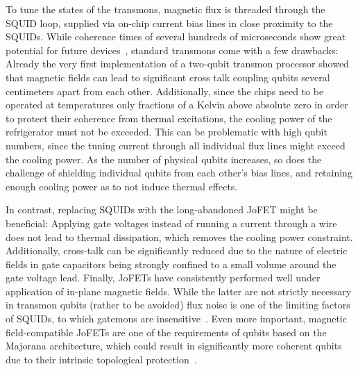 To tune the states of the transmons, magnetic flux is threaded through the SQUID loop, supplied via on-chip current bias lines in close proximity to the SQUIDs.
%
While coherence times of several hundreds of microseconds show great potential for future devices~\cite{placeNewMaterialPlatform2020}, standard transmons come with a few drawbacks:
%
Already the very first implementation of a two-qubit transmon processor showed that magnetic fields can lead to significant cross talk coupling qubits several centimeters apart from each other\cite{dicarloDemonstrationTwoqubitAlgorithms2009}.
%
Additionally, since the chips need to be operated at temperatures only fractions of a Kelvin above absolute zero in order to protect their coherence from thermal excitations, the cooling power of the refrigerator must not be exceeded.
%
This can be problematic with high qubit numbers, since the tuning current through all individual flux lines might exceed the cooling power.
%
As the number of physical qubits increases, so does the challenge of shielding individual qubits from each other's bias lines, and retaining enough cooling power as to not induce thermal effects.

In contrast, replacing SQUIDs with the long-abandoned JoFET might be beneficial:
%
Applying gate voltages instead of running a current through a wire does not lead to thermal dissipation, which removes the cooling power constraint.
%
Additionally, cross-talk can be significantly reduced due to the nature of electric fields in gate capacitors being strongly confined to a small volume around the gate voltage lead.
%
Finally, JoFETs have consistently performed well under application of in-plane magnetic fields.
%
While the latter are not strictly necessary in transmon qubits (rather to be avoided) flux noise is one of the limiting factors of SQUIDs, to which gatemons are insensitive~\cite{casparisSuperconductingGatemonQubit2018}.
%
Even more important, magnetic field-compatible JoFETs are one of the requirements of qubits based on the Majorana architecture, which could result in significantly more coherent qubits due to their intrinsic topological protection~\cite{hyartFluxcontrolledQuantumComputation2013}.


